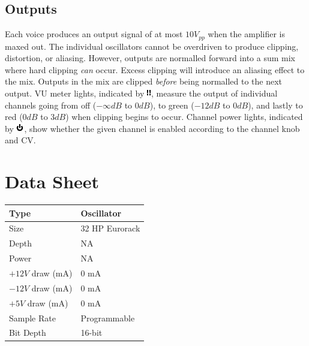 \documentclass[12pt,letter]{article}
\begin{document}
\subsection{Outputs}

Each voice produces an output signal of at most $10V_{pp}$ when the amplifier is maxed out. The individual oscillators cannot be overdriven to produce clipping, distortion, or aliasing. However, outputs are normalled forward into a sum mix where hard clipping \textit{can} occur. Excess clipping will introduce an aliasing effect to the mix. Outputs in the mix are clipped \textit{before} being normalled to the next output. VU meter lights, indicated by \includegraphics[height=\baselineskip]{img/VU}, measure the output of individual channels going from off ($-\infty dB$ to $0dB$), to green ($-12dB$ to $0dB$), and lastly to red ($0dB$ to $3dB$) when clipping begins to occur. Channel power lights, indicated by \includegraphics[height=\baselineskip]{img/OnOff}, show whether the given channel is enabled according to the channel knob and CV.


\clearpage
\section{Data Sheet}

\begin{table}[!htp]
\begin{tabular}{|l|l|}
\hline
Type             & Oscillator               \\
\hline
Size             & 32 HP Eurorack           \\
\hline
Depth            & NA                       \\
\hline
Power            & NA                       \\ %
\hline
$+12V$ draw (mA) & 0 mA                     \\
\hline
$-12V$ draw (mA) & 0 mA                     \\
\hline
$+5V$ draw (mA)  & 0 mA                     \\
\hline
Sample Rate      & Programmable             \\
\hline
Bit Depth        & 16-bit                   \\
\hline
\end{tabular}
\end{table}


\clearpage
\renewcommand\refname{References}
\nocite{*}


\end{document}

